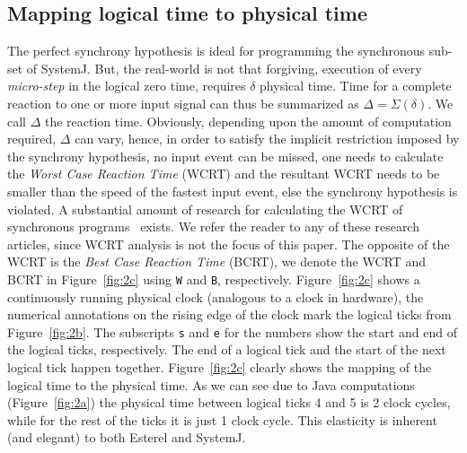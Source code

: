 \subsection{Mapping logical time to physical time}
\label{sec:mapping-logical-time}

The perfect synchrony hypothesis is ideal for programming the
synchronous sub-set of SystemJ. But, the real-world is not that
forgiving, execution of every \textit{micro-step} in the logical zero
time, requires $\delta$ physical time. Time for a complete reaction to
one or more input signal can thus be summarized as $\Delta = \Sigma
(\delta)$. We call $\Delta$ the reaction time. Obviously, depending upon
the amount of computation required, $\Delta$ can vary, hence, in order
to satisfy the implicit restriction imposed by the synchrony hypothesis,
no input event can be missed, one needs to calculate the \textit{Worst
  Case Reaction Time} (WCRT) and the resultant WCRT needs to be smaller
than the speed of the fastest input event, else the synchrony hypothesis
is violated. A substantial amount of research for calculating the WCRT
of synchronous programs~\cite{proop10,boldt07,wilhelm08} exists. We
refer the reader to any of these research articles, since WCRT analysis
is not the focus of this paper. The opposite of the WCRT is the
\textit{Best Case Reaction Time} (BCRT), we denote the WCRT and BCRT in
Figure~\ref{fig:2c} using \texttt{W} and \texttt{B},
respectively. Figure~\ref{fig:2c} shows a continuously running physical
clock (analogous to a clock in hardware), the numerical annotations on
the rising edge of the clock mark the logical ticks from
Figure~\ref{fig:2b}. The subscripts \texttt{s} and \texttt{e} for the
numbers show the start and end of the logical ticks, respectively. The
end of a logical tick and the start of the next logical tick happen
together. Figure~\ref{fig:2c} clearly shows the mapping of the logical
time to the physical time. As we can see due to Java computations
(Figure~\ref{fig:2a}) the physical time between logical ticks 4 and 5 is
2 clock cycles, while for the rest of the ticks it is just 1 clock
cycle. This elasticity is inherent (and elegant) to both Esterel and
SystemJ.



